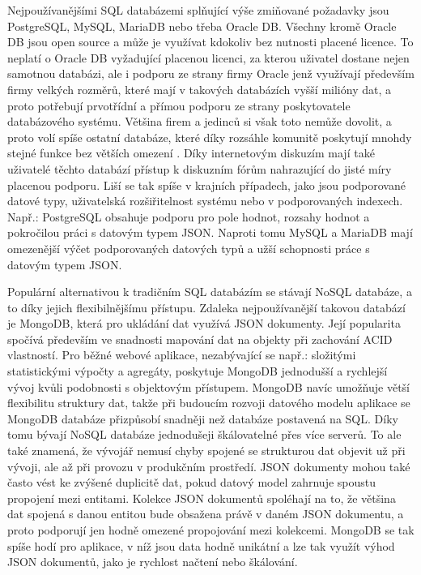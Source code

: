 		Nejpoužívanějšími \Ac{SQL} databázemi splňující výše zmiňované požadavky jsou PostgreSQL, MySQL, MariaDB
		nebo třeba Oracle DB.
		Všechny kromě Oracle DB jsou open source a může je využívat kdokoliv bez nutnosti placené licence.
		To neplatí o Oracle DB vyžadující placenou licenci, za kterou uživatel dostane nejen samotnou databázi, ale
		i podporu ze strany firmy Oracle jenž využívají především firmy velkých rozměrů, které mají v takových databázích
		vyšší milióny dat, a proto potřebují prvotřídní a přímou podporu ze strany poskytovatele databázového systému.
		Většina firem a jedinců si však toto nemůže dovolit, a proto volí spíše ostatní databáze, které díky rozsáhle komunitě poskytují mnohdy
		stejné funkce bez větších omezení .
		Díky internetovým diskuzím mají také uživatelé těchto databází přístup k diskuzním fórům nahrazující do jisté míry
		placenou podporu.
		Liší se tak spíše v krajních případech, jako jsou podporované datové typy, uživatelská rozšiřitelnost systému
		nebo v podporovaných indexech.
		Např.: PostgreSQL obsahuje podporu pro pole hodnot, rozsahy hodnot a pokročilou práci s datovým typem \Ac{JSON}.
		Naproti tomu MySQL a MariaDB mají omezenější výčet podporovaných datových typů a užší schopnosti práce s datovým
		typem \Ac{JSON}.

		Populární alternativou k tradičním \Ac{SQL} databázím se stávají \Ac{NoSQL} databáze, a to
		díky jejich flexibilnějšímu přístupu.
		Zdaleka nejpoužívanější takovou databází je MongoDB, která pro ukládání dat využívá \Ac{JSON} dokumenty.
		Její popularita spočívá především ve snadnosti mapování dat na objekty při zachování \Ac{ACID} vlastností.
		Pro běžné webové aplikace, nezabývající se např.: složitými statistickými výpočty a agregáty, poskytuje MongoDB
		jednodušší a rychlejší vývoj kvůli podobnosti s objektovým přístupem.
		MongoDB navíc umožňuje větší flexibilitu struktury dat, takže při budoucím rozvoji datového modelu aplikace se
		MongoDB databáze přizpůsobí snadněji než databáze postavená na \Ac{SQL}.
		Díky tomu bývají \Ac{NoSQL} databáze jednodušeji škálovatelné přes více serverů.\cite{when_to_use_nosql}
		To ale také znamená, že vývojář nemusí chyby spojené se strukturou dat objevit už při vývoji, ale až při provozu
		v produkčním prostředí.
		\Ac{JSON} dokumenty mohou také často vést ke zvýšené duplicitě dat, pokud datový model zahrnuje spoustu
		propojení mezi entitami.
		Kolekce \Ac{JSON} dokumentů spoléhají na to, že většina dat
		spojená s danou entitou bude obsažena právě v daném \Ac{JSON} dokumentu, a proto podporují jen hodně
		omezené propojování mezi kolekcemi.
		MongoDB se tak spíše hodí pro aplikace, v níž jsou data hodně unikátní a lze tak využít výhod \Ac{JSON}
		dokumentů, jako je rychlost načtení nebo škálování.\cite{why_you_should_never_use_mongodb}

